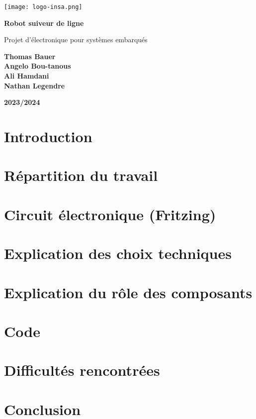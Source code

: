 \documentclass[12pt]{article}
\begin{document}
\begin{titlepage}
    \centering
    
    \texttt{[image: logo-insa.png]}\par\vspace{1cm}
    
    {\LARGE\bfseries Robot suiveur de ligne\par}
    
    {\Large Projet d'électronique pour systèmes embarqués\par}
    
    \vspace{2cm}
    
    \vfill
    \begin{flushleft}
        \textbf{Thomas Bauer}\\
        \textbf{Angelo Bou-tanous}\\
        \textbf{Ali Hamdani}\\
        \textbf{Nathan Legendre}
    \end{flushleft}
        \vfill
    \begin{flushright}
        \textbf{2023/2024}
    \end{flushright}
    
\end{titlepage}

\newpage

\section*{Introduction}


\section{Répartition du travail}


\section{Circuit électronique (Fritzing)}


\section{Explication des choix techniques}


\section{Explication du rôle des composants}


\section{Code}


\section{Difficultés rencontrées}


\section{Conclusion}

\end{document}
